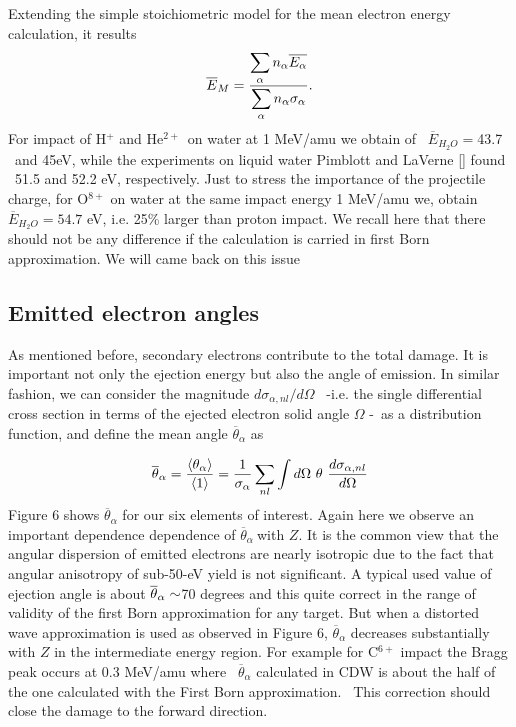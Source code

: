\documentclass[preprint,showpacs,pra]{revtex4}
\begin{document}
Extending the simple stoichiometric model for the mean electron energy
calculation, it results%
\begin{equation}
\overline{E}_{M}=\frac{\dsum\limits_{\alpha }n_{\alpha }\overline{E_{\alpha }%
}}{\dsum\limits_{\alpha }n_{\alpha }\sigma _{\alpha }}.  \label{70}
\end{equation}%
For impact of H$^{+}$ and He$^{2+~}$ on water at 1 MeV/amu we obtain of \ $%
\overline{E}_{H_{2}O}=$43.7 \ and 45eV, while the experiments on liquid
water Pimblott and LaVerne [] found \ 51.5 and 52.2 eV, respectively. Just
to stress the importance of the projectile charge, for O$^{8+}$ on water at
the same impact energy 1 MeV/amu we, obtain $\overline{E}_{H_{2}O}=54.7$ eV,
i.e. 25\% larger than proton impact. We recall here that there should not be
any difference if the calculation is carried in first Born approximation. We
will came back on this issue

\subsection{Emitted electron angles}

As mentioned before, secondary electrons contribute to the total damage. It
is important not only the ejection energy but also the angle of emission. In
similar fashion, we can consider the magnitude $d\sigma _{\alpha
,nl}/d\Omega $ \ -i.e. the single differential cross section in terms of the
ejected electron solid angle $\Omega $ -\ as a distribution function, and
define the mean angle $\overline{\theta }_{\alpha }$ as

\begin{equation}
\overline{\theta }_{\alpha }=\frac{\langle \theta _{\alpha }\rangle }{%
\langle 1\rangle }=\frac{1}{\sigma _{\alpha }}\dsum\limits_{nl}\int d\Omega
\ \theta \ \frac{d\sigma _{\alpha ,nl}}{d\Omega }
\end{equation}%
Figure 6 shows $\overline{\theta }_{\alpha }$ for our six elements of
interest. Again here we observe an important dependence dependence of $%
\overline{\theta }_{\alpha }\ $with $Z.$ It is the common view \cite%
{Rudd1992} that the angular dispersion of emitted electrons are nearly
isotropic due to the fact that angular anisotropy of sub-50-eV yield is not
significant. A typical used value of ejection angle is about $\overline{%
\theta }_{\alpha }\sim $70 degrees \cite{surdutovic2018} and this quite
correct in the range of validity of the first Born approximation for any
target. But when a distorted wave approximation is used as observed in
Figure 6, $\overline{\theta }_{\alpha }$ decreases substantially with $Z$ in
the intermediate energy region. For example for C$^{6+}$ impact the Bragg
peak occurs at 0.3 MeV/amu where \ $\overline{\theta }_{\alpha }$ calculated
in CDW is about the half of the one calculated with the First Born
approximation. \ This correction should close the damage to the forward
direction.
\end{document}
